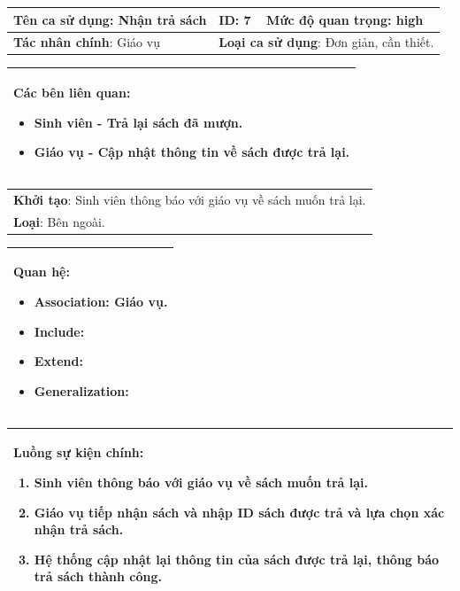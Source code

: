 \documentclass[12pt]{report}
\begin{document}
\begin{center}
\newpage
\begin{tabular}{| m{6cm} | m{3cm} | m{6cm} |}
    \hline
    \textbf{Tên ca sử dụng}: Nhận trả sách & \textbf{ID}: 7 & \textbf{Mức độ quan trọng}: high \\
    \hline
    \textbf{Tác nhân chính}: Giáo vụ  & \multicolumn{2}{|l|}{\textbf{Loại ca sử dụng}: Đơn giản, cần thiết.} \\
    \hline
\end{tabular}
\begin{tabular}{| m{15.9cm} |}
    \hline
        \textbf{Các bên liên quan:} 
        \begin{itemize}
            \item Sinh viên - Trả lại sách đã mượn. 
            \item Giáo vụ - Cập nhật thông tin về sách được trả lại. 
        \end{itemize} \\
    \hline
\end{tabular}

\begin{tabular}{| m{15.9cm} |}
    \hline
    \textbf{Khởi tạo}: Sinh viên thông báo với giáo vụ về sách muốn trả lại. \\
    \textbf{Loại}: Bên ngoài.  \\
    \hline
\end{tabular}

\begin{tabular}{| m{15.9cm} |}
    \hline
    \textbf{Quan hệ}:
    \begin{itemize}
        \item Association: Giáo vụ. 
        \item Include: 
        \item Extend: 
        \item Generalization: 
    \end{itemize} \\
    \hline
\end{tabular}

\begin{tabular}{| m{15.9cm} |}
    \hline
    \textbf{Luồng sự kiện chính}:
    \begin{enumerate}
        \item Sinh viên thông báo với giáo vụ về sách muốn trả lại. 
        \item Giáo vụ tiếp nhận sách và nhập ID sách được trả và lựa chọn xác nhận trả sách. 
        \item Hệ thống cập nhật lại thông tin của sách được trả lại, thông báo trả sách thành công. 
    \end{enumerate} \\
    \hline
\end{tabular}


\end{center}
\end{document}
